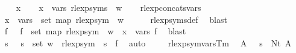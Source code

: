 \begin{isabellebody}
%
\isadelimproof
%
\endisadelimproof
%
\isatagproof
{}\isamarkupfalse%
\isanewline
\ \ \isamarkupfalse%
\ x\isanewline
\ \ \isamarkupfalse%
\ {\isachardoublequoteopen}x\ {\isasymin}\ vars\ {\isacharparenleft}{\kern0pt}rlexp{\isacharunderscore}{\kern0pt}syms\ {\isasymgamma}{\isacharprime}{\kern0pt}\ w{\isacharparenright}{\kern0pt}{\isachardoublequoteclose}\isanewline
\ \ \isamarkupfalse%
\ rlexp{\isacharunderscore}{\kern0pt}concats{\isacharunderscore}{\kern0pt}vars\ \isamarkupfalse%
\ {\isachardoublequoteopen}x\ {\isasymin}\ {\isasymUnion}{\isacharparenleft}{\kern0pt}vars\ {\isacharbackquote}{\kern0pt}\ set\ {\isacharparenleft}{\kern0pt}map\ {\isacharparenleft}{\kern0pt}rlexp{\isacharunderscore}{\kern0pt}sym\ {\isasymgamma}{\isacharprime}{\kern0pt}{\isacharparenright}{\kern0pt}\ w{\isacharparenright}{\kern0pt}{\isacharparenright}{\kern0pt}{\isachardoublequoteclose}\isanewline
\ \ \ \ \isamarkupfalse%
\ rlexp{\isacharunderscore}{\kern0pt}syms{\isacharunderscore}{\kern0pt}def\ \isamarkupfalse%
\ blast\isanewline
\ \ \isamarkupfalse%
\ \isamarkupfalse%
\ f\ \ {\isacharasterisk}{\kern0pt}{\isacharcolon}{\kern0pt}\ {\isachardoublequoteopen}f\ {\isasymin}\ set\ {\isacharparenleft}{\kern0pt}map\ {\isacharparenleft}{\kern0pt}rlexp{\isacharunderscore}{\kern0pt}sym\ {\isasymgamma}{\isacharprime}{\kern0pt}{\isacharparenright}{\kern0pt}\ w{\isacharparenright}{\kern0pt}\ {\isasymand}\ x\ {\isasymin}\ vars\ f{\isachardoublequoteclose}\ \isamarkupfalse%
\ blast\isanewline
\ \ \isamarkupfalse%
\ \isamarkupfalse%
\ s\ \ {\isacharasterisk}{\kern0pt}{\isacharasterisk}{\kern0pt}{\isacharcolon}{\kern0pt}\ {\isachardoublequoteopen}s\ {\isasymin}\ set\ w\ {\isasymand}\ rlexp{\isacharunderscore}{\kern0pt}sym\ {\isasymgamma}{\isacharprime}{\kern0pt}\ s\ {\isacharequal}{\kern0pt}\ f{\isachardoublequoteclose}\ \isamarkupfalse%
\ auto\isanewline
\ \ \isamarkupfalse%
\ {\isacharasterisk}{\kern0pt}\ rlexp{\isacharunderscore}{\kern0pt}sym{\isacharunderscore}{\kern0pt}vars{\isacharunderscore}{\kern0pt}Tm\ \isamarkupfalse%
\ A\ \ {\isacharasterisk}{\kern0pt}{\isacharasterisk}{\kern0pt}{\isacharasterisk}{\kern0pt}{\isacharcolon}{\kern0pt}\ {\isachardoublequoteopen}s\ {\isacharequal}{\kern0pt}\ Nt\ A{\isachardoublequoteclose}\ \isamarkupfalse%

\end{isabellebody}

